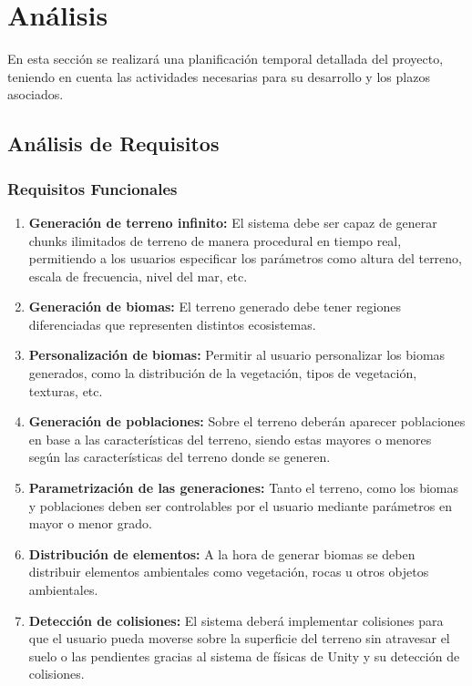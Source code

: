 \section{Análisis}
En esta sección se realizará una planificación temporal detallada del proyecto, teniendo en cuenta las actividades necesarias para su desarrollo y los plazos asociados.

    \subsection{Análisis de Requisitos}
        \subsubsection{Requisitos Funcionales}
            \begin{enumerate}
                \item \textbf{Generación de terreno infinito:} El sistema debe ser capaz de generar chunks ilimitados de terreno de manera procedural en tiempo real, permitiendo a los usuarios especificar los parámetros como altura del terreno, escala de frecuencia, nivel del mar, etc.
                \item \textbf{Generación de biomas:} El terreno generado debe tener regiones diferenciadas que representen distintos ecosistemas.
                \item \textbf{Personalización de biomas:} Permitir al usuario personalizar los biomas generados, como la distribución de la vegetación, tipos de vegetación, texturas, etc.
                \item \textbf{Generación de poblaciones:} Sobre el terreno deberán aparecer poblaciones en base a las características del terreno, siendo  estas mayores o menores según las características del terreno donde se generen.
                \item \textbf{Parametrización de las generaciones:} Tanto el terreno, como los biomas y poblaciones deben ser controlables por el usuario mediante parámetros en mayor o menor grado.
                \item \textbf{Distribución de elementos:} A la hora de generar biomas se deben distribuir elementos ambientales como vegetación, rocas u otros objetos ambientales.
                \item \textbf{Detección de colisiones:} El sistema deberá implementar colisiones para que el usuario pueda moverse sobre la superficie del terreno sin atravesar el suelo o las pendientes gracias al sistema de físicas de Unity y su detección de colisiones.

\end{enumerate}
